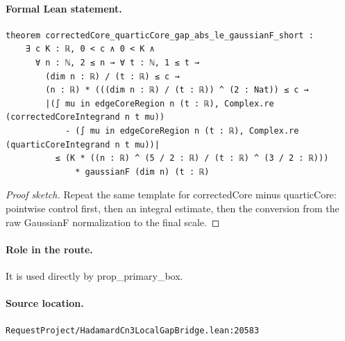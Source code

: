 \medskip
\paragraph{Formal Lean statement.}
\begin{verbatim}
theorem correctedCore_quarticCore_gap_abs_le_gaussianF_short :
    ∃ c K : ℝ, 0 < c ∧ 0 < K ∧
      ∀ n : ℕ, 2 ≤ n → ∀ t : ℕ, 1 ≤ t →
        (dim n : ℝ) / (t : ℝ) ≤ c →
        (n : ℝ) * (((dim n : ℝ) / (t : ℝ)) ^ (2 : Nat)) ≤ c →
        |(∫ mu in edgeCoreRegion n (t : ℝ), Complex.re (correctedCoreIntegrand n t mu))
            - (∫ mu in edgeCoreRegion n (t : ℝ), Complex.re (quarticCoreIntegrand n t mu))|
          ≤ (K * ((n : ℝ) ^ (5 / 2 : ℝ) / (t : ℝ) ^ (3 / 2 : ℝ)))
              * gaussianF (dim n) (t : ℝ)
\end{verbatim}
\begin{proof}[Proof sketch]
Repeat the same template for correctedCore minus quarticCore: pointwise control first, then an integral estimate, then the conversion from the raw GaussianF normalization to the final scale.
\end{proof}
\paragraph{Role in the route.}
It is used directly by prop\_primary\_box.
\paragraph{Source location.}
\texttt{RequestProject/HadamardCn3LocalGapBridge.lean:20583}
\medskip
